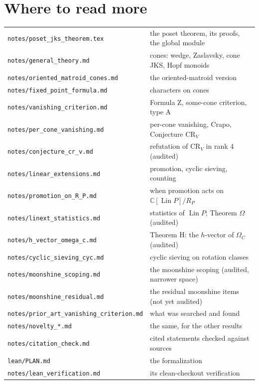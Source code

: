\documentclass[11pt]{article}
\theoremstyle{definition}
\theoremstyle{remark}
\newcommand{\Lin}{\operatorname{Lin}}
\newcommand{\src}[1]{\nolinkurl{#1}}
\begin{document}
\section*{Where to read more}

\begin{center}
\small
\begin{tabular}{ll}
\src{notes/poset_jks_theorem.tex} & the poset theorem, its proofs, the global module\\
\src{notes/general_theory.md} & cones: wedge, Zaslavsky, cone JKS, Hopf monoids\\
\src{notes/oriented_matroid_cones.md} & the oriented-matroid version\\
\src{notes/fixed_point_formula.md} & characters on cones\\
\src{notes/vanishing_criterion.md} & Formula Z, some-cone criterion, type A\\
\src{notes/per_cone_vanishing.md} & per-cone vanishing, Crapo, Conjecture CR$_V$\\
\src{notes/conjecture_cr_v.md} & refutation of CR$_V$ in rank 4 (audited)\\
\src{notes/linear_extensions.md} & promotion, cyclic sieving, counting\\
\src{notes/promotion_on_R_P.md} & when promotion acts on $\mathbb C[\Lin P]/R_P$\\
\src{notes/linext_statistics.md} & statistics of $\Lin P$; Theorem $\Omega$ (audited)\\
\src{notes/h_vector_omega_c.md} & Theorem H: the $h$-vector of $\Omega_C$ (audited)\\
\src{notes/cyclic_sieving_cyc.md} & cyclic sieving on rotation classes\\
\src{notes/moonshine_scoping.md} & the moonshine scoping (audited, narrower space)\\
\src{notes/moonshine_residual.md} & the residual moonshine items (not yet audited)\\
\src{notes/prior_art_vanishing_criterion.md} & what was searched and found\\
\src{notes/novelty_*.md} & the same, for the other results\\
\src{notes/citation_check.md} & cited statements checked against sources\\
\src{lean/PLAN.md} & the formalization\\
\src{notes/lean_verification.md} & its clean-checkout verification
\end{tabular}
\end{center}
\end{document}
